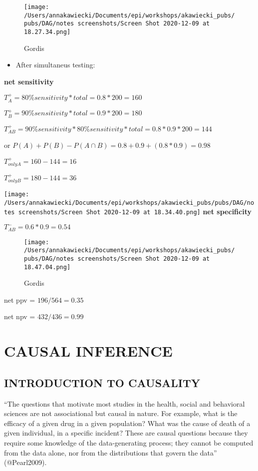 \documentclass[
]{article}
\providecommand{\tightlist}{%
  \setlength{\itemsep}{0pt}\setlength{\parskip}{0pt}}
\begin{document}
\begin{figure}
\centering
\texttt{[image: /Users/annakawiecki/Documents/epi/workshops/akawiecki\_pubs/pubs/DAG/notes screenshots/Screen Shot 2020-12-09 at 18.27.34.png]}
\caption{Gordis}
\end{figure}

\begin{itemize}
\tightlist
\item
  After simultaneus testing:
\end{itemize}

\textbf{net sensitivity}

\(T_A^+ =80\%sensitivity * total = 0.8*200= 160\)

\(T_B^+ =90\%sensitivity * total = 0.9*200= 180\)

\(T_{AB}^+ =90\%sensitivity * 80\%sensitivity* total = 0.8* 0.9*200= 144\)

or \(P(A)+P(B)-P(A\cap B) = 0.8+0.9+ (0.8*0.9) = 0.98\)

\(T_{only A}^+ = 160-144=16\)

\(T_{only B}^+ = 180-144=36\)

\texttt{[image: /Users/annakawiecki/Documents/epi/workshops/akawiecki\_pubs/pubs/DAG/notes screenshots/Screen Shot 2020-12-09 at 18.34.40.png]}
\textbf{net specificity}

\(T_{AB}^-= 0.6*0.9 = 0.54\)

\begin{figure}
\centering
\texttt{[image: /Users/annakawiecki/Documents/epi/workshops/akawiecki\_pubs/pubs/DAG/notes screenshots/Screen Shot 2020-12-09 at 18.47.04.png]}
\caption{Gordis}
\end{figure}

net ppv = \(196/564=0.35\)

net npv = \(432/436=0.99\)

\hypertarget{causal-inference}{%
\section{\texorpdfstring{\textbf{CAUSAL
INFERENCE}}{CAUSAL INFERENCE}}\label{causal-inference}}

\hypertarget{introduction-to-causality}{%
\subsection{INTRODUCTION TO CAUSALITY}\label{introduction-to-causality}}

``The questions that motivate most studies in the health, social and
behavioral sciences are not associational but causal in nature. For
example, what is the efficacy of a given drug in a given population?
What was the cause of death of a given individual, in a specific
incident? These are causal questions because they require some knowledge
of the data-generating process; they cannot be computed from the data
alone, nor from the distributions that govern the data'' (@Pearl2009).
\end{document}
